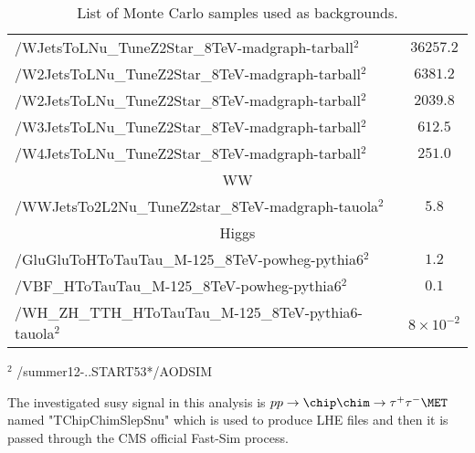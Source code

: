 \begin{table}[!ht]
\begin{center}
{\begin{tabular}{|l|c|}
/WJetsToLNu\_TuneZ2Star\_8TeV-madgraph-tarball$^{2}$          &  $36257.2$              \\
/W2JetsToLNu\_TuneZ2Star\_8TeV-madgraph-tarball$^{2}$         &  $6381.2$               \\
/W2JetsToLNu\_TuneZ2Star\_8TeV-madgraph-tarball$^{2}$         &  $2039.8$               \\
/W3JetsToLNu\_TuneZ2Star\_8TeV-madgraph-tarball$^{2}$         &  $612.5$               \\
/W4JetsToLNu\_TuneZ2Star\_8TeV-madgraph-tarball$^{2}$         &  $251.0$                \\
\hline
\multicolumn{2}{|c|}{WW}\\
\hline
/WWJetsTo2L2Nu\_TuneZ2star\_8TeV-madgraph-tauola$^{2}$        &  $5.8$                \\

\hline
\multicolumn{2}{|c|}{Higgs}\\
\hline
/GluGluToHToTauTau\_M-125\_8TeV-powheg-pythia6$^{2}$          &  $1.2$                \\
/VBF\_HToTauTau\_M-125\_8TeV-powheg-pythia6$^{2}$             &  $0.1$                \\
/WH\_ZH\_TTH\_HToTauTau\_M-125\_8TeV-pythia6-tauola$^{2}$     &  $8\times10^{-2}$                \\

\hline

\end{tabular}
}
\end{center}
$^{2}$ /summer12-..START53*/AODSIM\\

\caption{ 
  List of Monte Carlo samples used as backgrounds.
}
\label{Tab.MCSamples}

\end{table}

The investigated susy signal in this analysis is $pp \rightarrow \chip \chim \rightarrow \tau^+ \tau^- \MET$ named "TChipChimSlepSnu" which \PYTHIA is used to produce LHE files and then it is passed through the CMS official Fast-Sim process.
